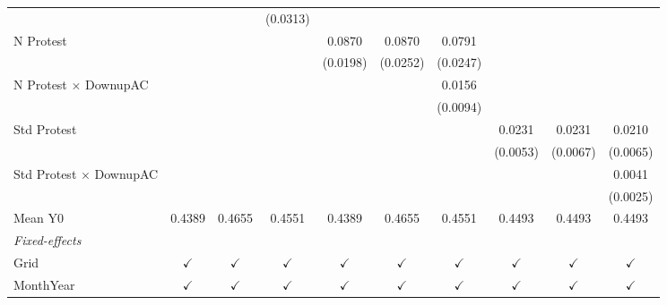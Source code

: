 \begin{table}[htbp]
\begin{tabular}{lccccccccc}
                                      &               &               & (0.0313)      &               &               &               &               &               &   \\   
      N Protest                       &               &               &               & 0.0870        & 0.0870        & 0.0791        &               &               &   \\   
                                      &               &               &               & (0.0198)      & (0.0252)      & (0.0247)      &               &               &   \\   
      N Protest $\times$ DownupAC     &               &               &               &               &               & 0.0156        &               &               &   \\   
                                      &               &               &               &               &               & (0.0094)      &               &               &   \\   
      Std Protest                     &               &               &               &               &               &               & 0.0231        & 0.0231        & 0.0210\\   
                                      &               &               &               &               &               &               & (0.0053)      & (0.0067)      & (0.0065)\\   
      Std Protest $\times$ DownupAC   &               &               &               &               &               &               &               &               & 0.0041\\   
                                      &               &               &               &               &               &               &               &               & (0.0025)\\   
      Mean Y0                         & 0.4389        & 0.4655        & 0.4551        & 0.4389        & 0.4655        & 0.4551        & 0.4493        & 0.4493        & 0.4493\\  
      \midrule
      \emph{Fixed-effects}\\
      Grid                            & $\checkmark$  & $\checkmark$  & $\checkmark$  & $\checkmark$  & $\checkmark$  & $\checkmark$  & $\checkmark$  & $\checkmark$  & $\checkmark$\\   
      MonthYear                       & $\checkmark$  & $\checkmark$  & $\checkmark$  & $\checkmark$  & $\checkmark$  & $\checkmark$  & $\checkmark$  & $\checkmark$  & $\checkmark$\\   

\end{tabular}
\end{table}
